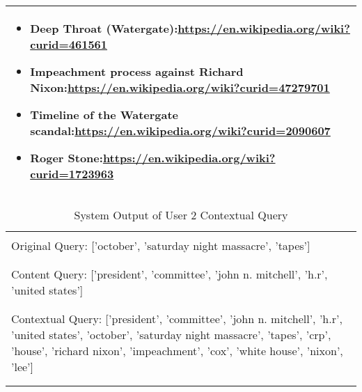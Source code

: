 \begin{table}[h]
\begin{tabular}{ Y }
\begin{itemize}
        \item Deep Throat (Watergate):\url{https://en.wikipedia.org/wiki?curid=461561} 
        \item Impeachment process against Richard Nixon:\url{https://en.wikipedia.org/wiki?curid=47279701} 
        \item Timeline of the Watergate scandal:\url{https://en.wikipedia.org/wiki?curid=2090607} 
        \item Roger Stone:\url{https://en.wikipedia.org/wiki?curid=1723963} 
    \end{itemize}\Tstrut\Bstrut\\\hline
    \end{tabular}
\end{table}

\begin{table}[h]
    \caption{System Output of User 2 Contextual Query}
    \label{tab:u2}
    \centering
    \begin{tabular}{ Y } \hline \\
    Original Query: ['october', 'saturday night massacre', 'tapes'] \Tstrut\Bstrut\\ \\ \hline \\
    Content Query: ['president', 'committee', 'john n. mitchell', 'h.r', 'united states']\Tstrut\Bstrut\\ \\ \hline \\
    Contextual Query: ['president', 'committee', 'john n. mitchell', 'h.r', 'united states', 'october', 'saturday night massacre', 'tapes', 'crp', 'house', 'richard nixon', 'impeachment', 'cox', 'white house', 'nixon', 'lee'] \Tstrut\Bstrut\\ \\ \hline \\ 

\end{tabular}
\end{table}
